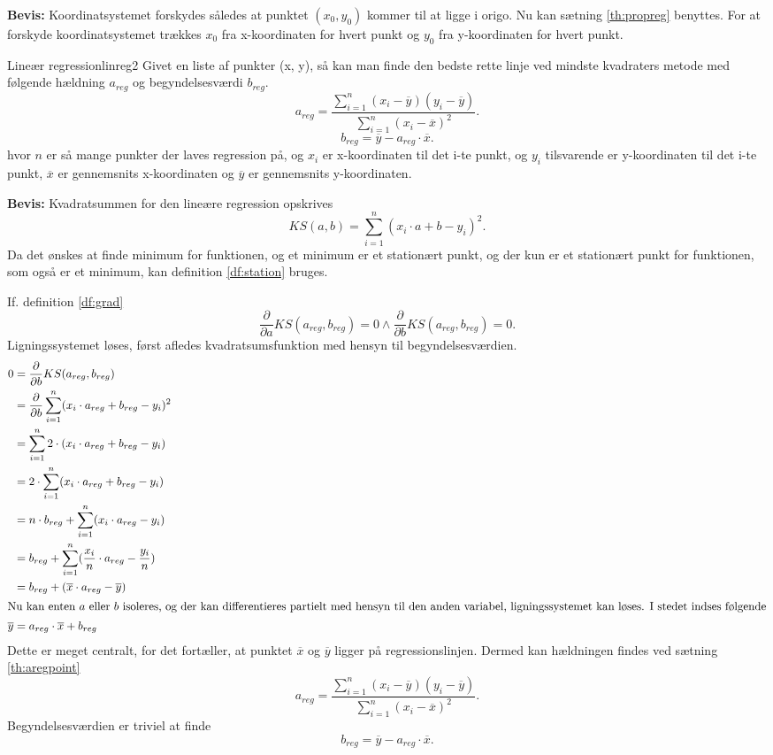 \documentclass{article}
\begin{document}
\textbf{Bevis:}
Koordinatsystemet forskydes således at punktet $(x_0, y_0)$ kommer til at ligge
i origo. Nu kan sætning \ref{th:propreg} benyttes. For at forskyde
koordinatsystemet trækkes $x_0$ fra x-koordinaten for hvert punkt og $y_0$ fra
y-koordinaten for hvert punkt.

\begin{theorem}{Lineær regression}{linreg2}
	Givet en liste af punkter (x, y), så kan man finde den bedste rette linje
	ved mindste kvadraters metode med følgende hældning $a_{reg}$ og
	begyndelsesværdi $b_{reg}$.
	\[
		a_{reg} = \frac{\sum_{i=1}^n (x_i-\overline{y})(y_i-\overline{y})}{\sum_{i=1}^n (x_i-\overline{x})^2}.
	\] 
	\[
		b_{reg} = \overline{y} - a_{reg} \cdot \overline{x}.
	\] 
	hvor $n$ er så mange punkter der laves regression på, og $x_i$ er x-koordinaten
	til det i-te punkt, og $y_i$ tilsvarende er y-koordinaten til det i-te punkt,
	$\overline{x}$ er gennemsnits x-koordinaten og $\overline{y}$ er
	gennemsnits y-koordinaten.
\end{theorem}

\textbf{Bevis:}
Kvadratsummen for den lineære regression opskrives
\[
	KS(a, b) = \sum_{i=1}^n (x_i \cdot a + b - y_i)^2.
\] 
Da det ønskes at finde minimum for funktionen, og et minimum er et stationært
punkt, og der kun er et stationært punkt for funktionen, som også er et
minimum, kan definition \ref{df:station} bruges.

\smallskip

If. definition \ref{df:grad}
\[
	\frac{\partial}{\partial a} KS(a_{reg}, b_{reg}) = 0 \land
	\frac{\partial}{\partial b} KS(a_{reg}, b_{reg}) = 0.
\] 
Ligningssystemet løses, først afledes kvadratsumsfunktion med hensyn til
begyndelsesværdien.
\begin{align*}
	0 &= \frac{\partial}{\partial b} KS(a_{reg}, b_{reg})\\
	  &= \frac{\partial}{\partial b} \sum_{i=1}^n (x_i \cdot a_{reg} + b_{reg} - y_i)^2\\
	  &= \sum_{i=1}^n 2 \cdot (x_i \cdot a_{reg} + b_{reg} - y_i)\\
	  &= 2 \cdot \sum_{i=1}^n (x_i \cdot a_{reg} + b_{reg} - y_i)\\
	  &= n \cdot b_{reg} + \sum_{i=1}^n (x_i \cdot a_{reg} - y_i)\\
	  &= b_{reg} + \sum_{i=1}^n (\frac{x_i}{n} \cdot a_{reg} - \frac{y_i}{n})\\
	  &= b_{reg} + (\overline{x} \cdot a_{reg} - \overline{y})\\
	  \intertext{Nu kan enten $a$ eller $b$ isoleres, og der kan differentieres
		  partielt med hensyn til den anden variabel, ligningssystemet kan
	  løses. I stedet indses følgende}
	\overline{y} &= a_{reg} \cdot \overline{x} + b_{reg}
\end{align*}
Dette er meget centralt, for det fortæller, at punktet $\overline{x}$ og
$\overline{y}$ ligger på regressionslinjen. Dermed kan hældningen findes ved
sætning \ref{th:aregpoint}
\[
	a_{reg} = \frac{\sum_{i=1}^n (x_i-\overline{y})(y_i-\overline{y})}{\sum_{i=1}^n (x_i-\overline{x})^2}.
\] 
Begyndelsesværdien er triviel at finde
\[
	b_{reg} = \overline{y} - a_{reg} \cdot \overline{x}.
\] 
\end{document}
